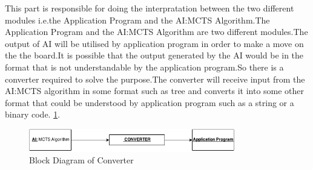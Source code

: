 This part is responsible for doing the interpratation between the two different modules i.e.the Application Program and the AI:MCTS Algorithm.The Application Program and the AI:MCTS Algorithm are two different modules.The output of  AI will be utilised by application program in order to make a move on the the board.It is possible that the output generated by the AI would be in the format that is not understandable by the application program.So there is a converter required to solve the purpose.The converter will receive input from the AI:MCTS algorithm in some format such as tree and converts it into some other format that could be understood by application program such as a string or a binary code. \ref{fig:flowchart}.
\newpage


\begin{figure}[H]
	\centering
	\includegraphics[width=0.80\textwidth]{2General_Architecture/2.2API/img/CONVERTER.png}
	\caption{Block Diagram of Converter}
	\label{fig:flowchart}
\end{figure}
\thispagestyle{empty}

